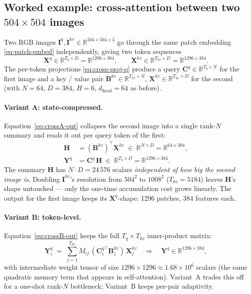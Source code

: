 \documentclass[11pt,a4paper]{article}
\begin{document}
\subsection{Worked example: cross-attention between two $504\!\times\!504$ images}
\label{sec:cross-worked}

Two RGB images $\bm{I}^q,\bm{I}^{kv}\in\mathbb{R}^{504\times 504\times 3}$
go through the same patch embedding \eqref{eq:patch-embed} independently,
giving two token sequences
\begin{equation}
  \bm{X}^{q}\in\mathbb{R}^{T_q\times D}=\mathbb{R}^{1296\times 384},
  \qquad
  \bm{X}^{kv}\in\mathbb{R}^{T_{kv}\times D}=\mathbb{R}^{1296\times 384}.
\end{equation}
The per-token projections \eqref{eq:cross-proj-q} produce a query
$\bm{C}^q\in\mathbb{R}^{T_q\times N}$ for the first image and a key /
value pair $\bm{B}^{kv}\in\mathbb{R}^{T_{kv}\times N}$,
$\bm{X}^{kv}\in\mathbb{R}^{T_{kv}\times D}$ for the second (with
$N=64$, $D=384$, $H=6$, $d_{\text{head}}=64$ as before).

\paragraph{Variant A: state-compressed.}
Equation~\eqref{eq:crossA-out} collapses the
second image into a single rank-$N$ summary and reads it out per
query token of the first:
\begin{align}
  \bm{H} &= (\bm{B}^{kv})^\top \bm{X}^{kv}
        \;\in\;\mathbb{R}^{N\times D} = \mathbb{R}^{64\times 384}, \\
  \bm{Y}^q &= \bm{C}^q\,\bm{H}
        \;\in\;\mathbb{R}^{T_q\times D} = \mathbb{R}^{1296\times 384}.
\end{align}
The summary $\bm{H}$ has $N\!\cdot\!D = 24\,576$ scalars
\emph{independent of how big the second image is}. Doubling
$\bm{I}^{kv}$'s resolution from $504^{2}$ to $1008^{2}$ ($T_{kv}\!=\!5184$)
leaves $\bm{H}$'s shape untouched — only the one-time accumulation cost
grows linearly. The output for the first image keeps its
$\bm{X}^{q}$-shape: 1296 patches, 384 features each.

\paragraph{Variant B: token-level.}
Equation~\eqref{eq:crossB-out} keeps the full $T_q\!\times\!T_{kv}$
inner-product matrix:
\begin{equation}
  \bm{Y}^q_{i}
   \;=\; \sum_{j=1}^{T_{kv}} M_{ij}\,(\bm{C}_i^{q\top}\bm{B}_j^{kv})\,\bm{X}_j^{kv}
   \quad\Rightarrow\quad
   \bm{Y}^q\in\mathbb{R}^{1296\times 384},
\end{equation}
with intermediate weight tensor of size
$1296\!\times\!1296\approx 1.68\!\times\!10^{6}$ scalars (the same
quadratic memory term that appears in self-attention). Variant~A
trades this off for a one-shot rank-$N$ bottleneck; Variant~B keeps
per-pair adaptivity.
\end{document}
